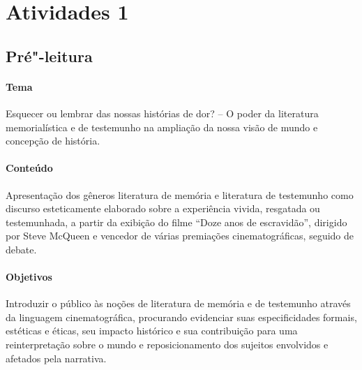 \documentclass[11pt]{extarticle}
\begin{document}
\begin{abstract}
Para interpretar esta obra de literatura brasileira contemporânea,
buscamos mobilizar uma série de conhecimentos, sociológicos,
antropológicos, históricos e geográficos, que transcendem o texto e nos
pintam um verdadeiro painel deste complicado Brasil de princípios do
século \textsc{xxi} - sobretudo, das camadas mais marginalizadas da nossa
juventude. Guiou"-nos a busca do ``aprimoramento do educando como pessoa
humana, incluindo a formação ética e o desenvolvimento da autonomia
intelectual e do pensamento crítico'', como preconiza o Artigo nº 35 da
LDB 9394/96. Esperamos ser bem"-sucedidos neste intento, de modo a
suscitar entre os nossos jovens o gosto pela leitura e por valores
humanos tão caros como o respeito aos diferentes, o apreço pela justiça,
a solidariedade e a efetivação de uma liberdade que seja capaz de
conjugar os interesses coletivos e individuais.

\end{abstract}

\tableofcontents

\section{Atividades 1}



\subsection{Pré"-leitura}

\paragraph{Tema} Esquecer ou lembrar das nossas histórias de dor? -- O
poder da literatura memorialística e de testemunho na ampliação da nossa
visão de mundo e concepção de história.

\paragraph{Conteúdo} Apresentação dos gêneros literatura de memória e
literatura de testemunho como discurso esteticamente elaborado sobre a
experiência vivida, resgatada ou testemunhada, a partir da exibição do
filme ``Doze anos de escravidão'', dirigido por Steve McQueen e vencedor
de várias premiações cinematográficas, seguido de debate.

\paragraph{Objetivos} Introduzir o público às noções de literatura de
memória e de testemunho através da linguagem cinematográfica, procurando
evidenciar suas especificidades formais, estéticas e éticas, seu impacto
histórico e sua contribuição para uma reinterpretação sobre o mundo e
reposicionamento dos sujeitos envolvidos e afetados pela narrativa.
\end{document}
